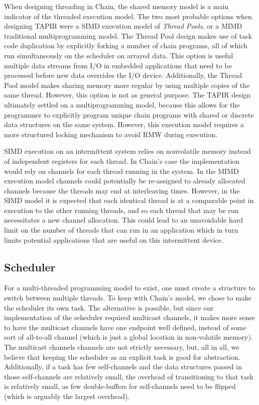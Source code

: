 \documentclass[11pt]{sensys-proc}
\newcommand{\chain}{Chain\xspace}
\begin{document}
When designing threading in Chain, the shared memory model is a main indicator
of the threaded execution model. The two most probable options when designing
TAPIR were a SIMD execution model of \textit{Thread Pools}, or a MIMD
traditional multiprogramming model. The Thread Pool design makes use of task
code duplication by explicitly forking a number of chain programs, all of which
run simultaneously on the scheduler on arrayed data. This option is useful
multiple data streams from I/O in embedded applications that need to be
processed before new data overrides the I/O device. Additionally, the Thread
Pool model makes sharing memory more regular by using multiple copies of the
same thread. However, this option is not as general purpose. The TAPIR design
ultimately settled on a multiprogramming model, because this allows for the
programmer to explicitly program unique chain programs with shared or discrete
data structures on the same system. However, this execution model requires a
more structured locking mechanism to avoid RMW during execution.

SIMD execution on an intermittent system relies on nonvolatile memory instead
of independent registers for each thread. In Chain's case the implementation
would rely on channels for each thread running in the system. In the MIMD
execution model channels could potentially be re-assigned to already allocated
channels because the threads may end at interleaving times. However, in the
SIMD model it is expected that each identical thread is at a comparable point
in execution to the other running threads, and so each thread that may be
run necessitates a new channel allocation. This could lead to an unavoidable
hard limit on the number of threads that can run in an application which in
turn limits potential applications that are useful on this intermittent device.


\subsection{Scheduler}
For a multi-threaded programming model to exist, one must create a structure to
switch between multiple threads. To keep with \chain's model, we chose to make
the scheduler its own task. The alternative is possible, but since our
implementation of the scheduler required multicast channels, it makes more
sense to have the multicast channels have one endpoint well defined, instead of
some sort of all-to-all channel (which is just a global location in
non-volatile memory). The multicast channels channels are not strictly
necessary, but, all in all, we believe that keeping the scheduler as an
explicit task is good for abstraction. Additionally, if a task has few
self-channels and the data structures passed in those self-channels are
relatively small, the overhead of transitioning to that task is relatively
small, as few double-buffers for self-channels need to be flipped (which is
arguably the largest overhead).
\end{document}
